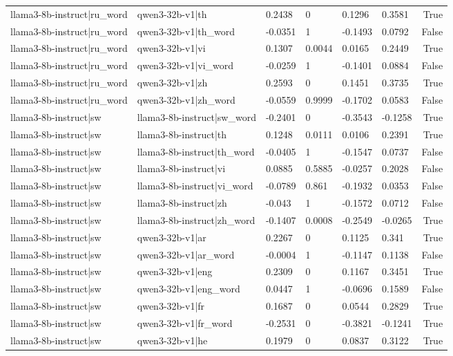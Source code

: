 \begin{table}
\begin{tabular}{llllllr}
llama3-8b-instruct|ru_word & qwen3-32b-v1|th & 0.2438 & 0 & 0.1296 & 0.3581 & True \\
llama3-8b-instruct|ru_word & qwen3-32b-v1|th_word & -0.0351 & 1 & -0.1493 & 0.0792 & False \\
llama3-8b-instruct|ru_word & qwen3-32b-v1|vi & 0.1307 & 0.0044 & 0.0165 & 0.2449 & True \\
llama3-8b-instruct|ru_word & qwen3-32b-v1|vi_word & -0.0259 & 1 & -0.1401 & 0.0884 & False \\
llama3-8b-instruct|ru_word & qwen3-32b-v1|zh & 0.2593 & 0 & 0.1451 & 0.3735 & True \\
llama3-8b-instruct|ru_word & qwen3-32b-v1|zh_word & -0.0559 & 0.9999 & -0.1702 & 0.0583 & False \\
llama3-8b-instruct|sw & llama3-8b-instruct|sw_word & -0.2401 & 0 & -0.3543 & -0.1258 & True \\
llama3-8b-instruct|sw & llama3-8b-instruct|th & 0.1248 & 0.0111 & 0.0106 & 0.2391 & True \\
llama3-8b-instruct|sw & llama3-8b-instruct|th_word & -0.0405 & 1 & -0.1547 & 0.0737 & False \\
llama3-8b-instruct|sw & llama3-8b-instruct|vi & 0.0885 & 0.5885 & -0.0257 & 0.2028 & False \\
llama3-8b-instruct|sw & llama3-8b-instruct|vi_word & -0.0789 & 0.861 & -0.1932 & 0.0353 & False \\
llama3-8b-instruct|sw & llama3-8b-instruct|zh & -0.043 & 1 & -0.1572 & 0.0712 & False \\
llama3-8b-instruct|sw & llama3-8b-instruct|zh_word & -0.1407 & 0.0008 & -0.2549 & -0.0265 & True \\
llama3-8b-instruct|sw & qwen3-32b-v1|ar & 0.2267 & 0 & 0.1125 & 0.341 & True \\
llama3-8b-instruct|sw & qwen3-32b-v1|ar_word & -0.0004 & 1 & -0.1147 & 0.1138 & False \\
llama3-8b-instruct|sw & qwen3-32b-v1|eng & 0.2309 & 0 & 0.1167 & 0.3451 & True \\
llama3-8b-instruct|sw & qwen3-32b-v1|eng_word & 0.0447 & 1 & -0.0696 & 0.1589 & False \\
llama3-8b-instruct|sw & qwen3-32b-v1|fr & 0.1687 & 0 & 0.0544 & 0.2829 & True \\
llama3-8b-instruct|sw & qwen3-32b-v1|fr_word & -0.2531 & 0 & -0.3821 & -0.1241 & True \\
llama3-8b-instruct|sw & qwen3-32b-v1|he & 0.1979 & 0 & 0.0837 & 0.3122 & True \\

\end{tabular}
\end{table}
